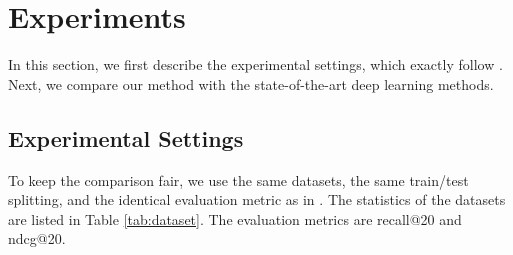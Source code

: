 \documentclass[sigconf]{acmart}
\begin{document}
\section{Experiments} \label{sec:exp}
In this section, we first describe the experimental settings, which exactly follow \cite{he2020lightgcn}. Next, we compare our method with the state-of-the-art deep learning methods.
\subsection{Experimental Settings}
To keep the comparison fair, we use the same datasets, the same train/test splitting, and the identical evaluation metric as in \cite{he2020lightgcn}. The statistics of the datasets are listed in Table \ref{tab:dataset}. The evaluation metrics are recall@20 and ndcg@20. 

\begin{table}[t]
\caption{Statistics of the experimented data.}
\label{tab:dataset}
\end{table}
\end{document}
